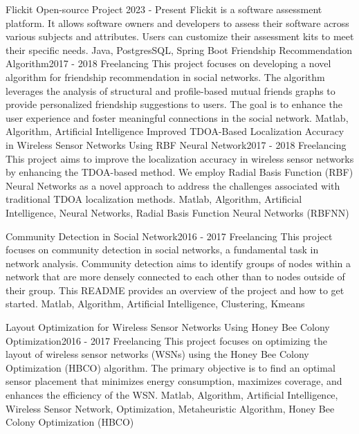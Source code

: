 
\begin{projects}
	\project
	{Flickit Open-source Project} {2023 - Present}
	{}
	{Flickit is a software assessment platform. It allows software owners and developers to assess their software across various subjects and attributes. Users can customize their assessment kits to meet their specific needs.}
	{Java, PostgresSQL, Spring Boot}
	\project
	{Friendship Recommendation Algorithm}{2017 - 2018}
	{ {Freelancing}}
	{This project focuses on developing a novel algorithm for friendship recommendation in social networks. The algorithm leverages the analysis of structural and profile-based mutual friends graphs to provide personalized friendship suggestions to users. The goal is to enhance the user experience and foster meaningful connections in the social network.}
	{Matlab, Algorithm, Artificial Intelligence}
	\project
	{Improved TDOA-Based Localization Accuracy in Wireless Sensor Networks Using RBF Neural Network}{2017 - 2018}
	{ {Freelancing} }
	{This project aims to improve the localization accuracy in wireless sensor networks by enhancing the TDOA-based method. We employ Radial Basis Function (RBF) Neural Networks as a novel approach to address the challenges associated with traditional TDOA localization methods.}
	{Matlab, Algorithm, Artificial Intelligence, Neural Networks, Radial Basis Function Neural Networks (RBFNN)}
	\newpage

	\project
	{Community Detection in Social Network}{2016 - 2017}
	{ {Freelancing} }
	{This project focuses on community detection in social networks, a fundamental task in network analysis. Community detection aims to identify groups of nodes within a network that are more densely connected to each other than to nodes outside of their group. This README provides an overview of the project and how to get started.}
	{Matlab, Algorithm, Artificial Intelligence, Clustering, Kmeans}

	\project
	{Layout Optimization for Wireless Sensor Networks Using Honey Bee Colony Optimization}{2016 - 2017}
	{ {Freelancing} }
	{This project focuses on optimizing the layout of wireless sensor networks (WSNs) using the Honey Bee Colony Optimization (HBCO) algorithm. The primary objective is to find an optimal sensor placement that minimizes energy consumption, maximizes coverage, and enhances the efficiency of the WSN.}
	{Matlab, Algorithm, Artificial Intelligence, Wireless Sensor Network, Optimization, Metaheuristic Algorithm, Honey Bee Colony Optimization (HBCO)}


\end{projects}
